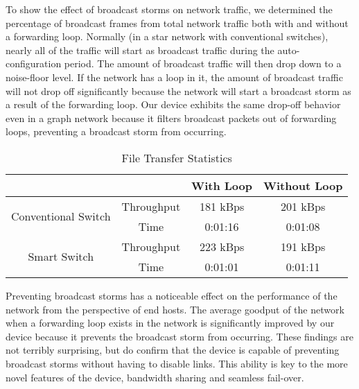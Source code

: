     To show the effect of broadcast storms on network traffic, we determined the percentage of broadcast frames from total network traffic both with and without a forwarding loop.
    Normally (in a star network with conventional switches), nearly all of the traffic will start as broadcast traffic during the auto-configuration period.
    The amount of broadcast traffic will then drop down to a noise-floor level.
    If the network has a loop in it, the amount of broadcast traffic will not drop off significantly because the network will start a broadcast storm as a result of the forwarding loop.
    Our device exhibits the same drop-off behavior even in a graph network because it filters broadcast packets out of forwarding loops, preventing a broadcast storm from occurring.

    \begin{table}[ht]
	    \centering
	    \caption{File Transfer Statistics}
	    \label{tab:throughput}
	    \begin{tabular}{|c|c|c|c|}
		    \hline
		    \multicolumn{2}{|c|}{} & With Loop	& Without Loop \\
		    \hline
		    \multirow{2}{*}{Conventional Switch}& Throughput	& 181 kBps	& 201 kBps \\ \cline{2-4}
		    & Time	& 0:01:16	& 0:01:08 \\
		    \hline
		    \multirow{2}{*}{Smart Switch}	& Throughput	& 223 kBps	& 191 kBps \\ \cline{2-4}
		    & Time	& 0:01:01	& 0:01:11\\
		    \hline
	    \end{tabular}
    \end{table}

    Preventing broadcast storms has a noticeable effect on the performance of the network from the perspective of end hosts.
    The average goodput of the network when a forwarding loop exists in the network is significantly improved by our device because it prevents the broadcast storm from occurring.
    These findings are not terribly surprising, but do confirm that the device is capable of preventing broadcast storms without having to disable links.
    This ability is key to the more novel features of the device, bandwidth sharing and seamless fail-over.

